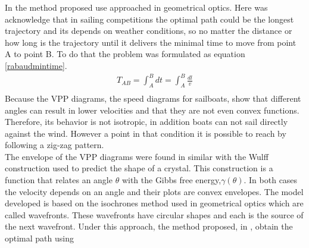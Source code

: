 In \cite{rabaudoptimal} the method proposed use approached in geometrical optics. 
Here was acknowledge that in sailing competitions the optimal path  could be the longest trajectory and its depends on weather conditions, so no matter the distance or how long is the trajectory until it delivers the minimal time to move from point A to point B. To do that the problem was formulated as equation \ref{rabaudmintime}.
\begin{equation} \label{rabaudmintime}
\begin{aligned}
T_{AB}=\int_{A}^{B} dt=\int_{A}^{B} \frac{dl}{v}  \\
\end{aligned}
\end{equation}
Because the VPP diagrams, the speed diagrams for sailboats, show that different angles can result in lower velocities  and that they are not even convex functions. Therefore, its behavior is not isotropic, in addition boats can not sail directly against the wind. However a point in that condition it is possible to reach by following a zig-zag pattern.\\
The envelope of the VPP diagrams were found in \cite{rabaudoptimal} similar with the Wulff construction used to predict the shape of a crystal. This construction is a function that relates an angle $\theta$ with the Gibbs free energy,$\gamma (\theta)$.  %
In both cases the velocity depends on an angle and their plots are convex envelopes.  The model developed is based on the isochrones method used in geometrical optics which are called wavefronts. These wavefronts have circular shapes and each is the source of the next wavefront. Under this approach, the method proposed, in \cite{rabaudoptimal}, obtain the optimal path using
